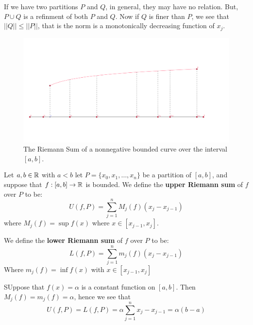If we have two partitions $P$ and  $Q$, in general, they may have no relation. But, $P \cup Q$ is a refinment of both  $P$ and  $Q$. Now if  $Q$ is finer than $P$, we see that  $||Q|| \leq ||P||$, that is the norm is a monotonically decreasing function of  $x_j$.

\begin{figure}
    \centering
    \includegraphics[scale = 0.5]{figures/partitionOfACurve.png}
    \caption{The Riemann Sum of a nonnegative bounded curve over the interval $[a,b]$.}
    \label{fig_5.2}
\end{figure}

\begin{definition}
    Let $a,b \in \mathbb{R}$ with  $a<b$ let $P=\{x_0,x_1, \dots, x_n\}$ be a partition of  $[a,b]$, and suppose that  $f:[a,b] \rightarrow \mathbb{R}$ is bounded. 
    We define the  \textbf{upper Riemann sum} of $f$ over  $P$ to be:
     \begin{equation}
         U(f,P)=\sum_{j=1}^{n}{M_j(f)(x_j-x_{j-1})}		
    \end{equation} 
    where $M_j(f)=\sup{f(x)}$ where  $x \in [x_{j-1},x_j]$.

We define the \textbf{lower Riemann sum} of $f$ over  $P$ to be:
     \begin{equation}
         L(f,P)=\sum_{j=1}^{n}{m_j(f)(x_j-x_{j-1})}
    \end{equation}
    Where $m_j(f)=\inf{f(x)}$ with  $x \in [x_{j-1},x_j]$
\end{definition}

\begin{remark}
    SUppose that $f(x)=\alpha$ is a constant function on  $[a,b]$. Then  $M_j(f)=m_j(f)=\alpha$, hence we see that
        \begin{equation*}
            U(f,P)=L(f,P)=\alpha\sum_{j=1}^{n}{x_j-x_{j-1}}=\alpha(b-a)
        \end{equation*} 
\end{remark}


